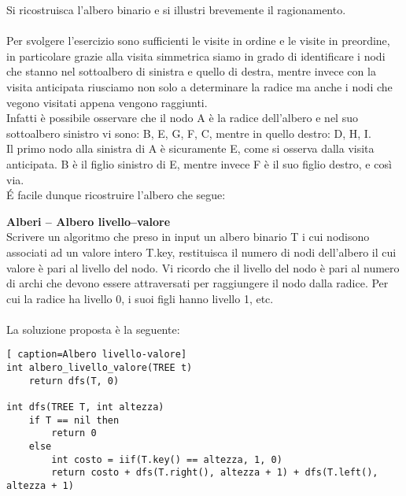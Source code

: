 \documentclass[../cheatSheetAlgoritmi.tex]{subfiles}
\begin{document}
Si ricostruisca l’albero binario e si illustri brevemente il ragionamento. \\\\
Per svolgere l'esercizio sono sufficienti le visite in ordine e le visite in preordine, in particolare grazie alla visita simmetrica siamo in grado di identificare i nodi che stanno nel sottoalbero di sinistra e quello di destra, mentre invece con la visita anticipata riusciamo non solo a determinare la radice ma anche i nodi che vegono visitati appena vengono raggiunti.\\
Infatti è possibile osservare che il nodo A è la radice dell'albero e nel suo sottoalbero sinistro vi sono: B, E, G, F, C, mentre in quello destro: D, H, I. \\
Il primo nodo alla sinistra di A è sicuramente E, come si osserva dalla visita anticipata. B è il figlio sinistro di E, mentre invece F è il suo figlio destro, e così via. \\É facile dunque ricostruire l'albero che segue: \\
\begin{center}
\end{center}

\textbf{Alberi – Albero livello–valore}\\
Scrivere un algoritmo che preso in input un albero binario T i cui nodisono associati ad un valore intero T.key, restituisca il numero di nodi dell’albero il cui valore è pari al livello del nodo. Vi ricordo che il livello del nodo è pari al numero di archi che devono essere attraversati per raggiungere il nodo dalla radice. Per cui la radice ha livello 0, i suoi figli hanno livello 1, etc.\\\\
La soluzione proposta è la seguente:
\begin{lstlisting}[ caption=Albero livello-valore]
int albero_livello_valore(TREE t)
	return dfs(T, 0)

int dfs(TREE T, int altezza)
	if T == nil then
   		return 0
  	else
		int costo = iif(T.key() == altezza, 1, 0)  	
  		return costo + dfs(T.right(), altezza + 1) + dfs(T.left(), altezza + 1)
\end{lstlisting}
\end{document}
